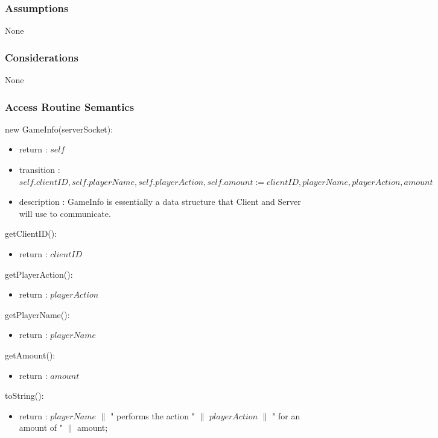 \documentclass[12pt, titlepage]{article}
\begin{document}
    \subsubsection* {Assumptions}
        None
    
    \subsubsection* {Considerations}
        None
    
    \subsubsection* {Access Routine Semantics}
    
        \noindent new GameInfo(serverSocket):
        \begin{itemize}
        \item return : $self$
        \item transition : $self.clientID, self.playerName, self.playerAction, self.amount := clientID, playerName, playerAction, amount$
        \item description : GameInfo is essentially a data structure that Client and Server will use to communicate.
        \end{itemize}
        
        \noindent getClientID():
        \begin{itemize}
        \item return : $clientID$
        \end{itemize}
        
        \noindent getPlayerAction():
        \begin{itemize}
        \item return : $playerAction$
        \end{itemize}
        
        \noindent getPlayerName():
        \begin{itemize}
        \item return : $playerName$
        \end{itemize}
        
        \noindent getAmount():
        \begin{itemize}
        \item return : $amount$
        \end{itemize}
        
        \noindent toString():
        \begin{itemize}
        \item return : $playerName$ $\|$ " performs the action " $\|$ $playerAction$ $\|$ " for an amount of " $\|$ amount;
        \end{itemize}        
                
\end{document}
